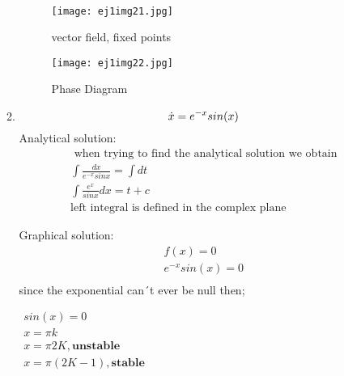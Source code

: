 \documentclass[a4paper,10pt]{article}
\begin{document}
\begin{enumerate}
\begin{enumerate}
\begin{equation}
\begin{aligned}
    		    \end{aligned}
		   \end{equation}
		   \begin{figure}[h]
                \centering
                \texttt{[image: ej1img21.jpg]}
                \caption{vector field, fixed points}
                \label{fig:mesh1}
        \end{figure}
        \begin{figure}[h]
                \centering
                \texttt{[image: ej1img22.jpg]}
                \caption{Phase Diagram}
                \label{fig:mesh1}
        \end{figure}
        \newpage
        \item
		    \begin{equation}
		        \dot{x}=e^{-x}sin(x)\\
		    \end{equation}
		    Analytical solution:
		    \begin{equation}
		        \begin{aligned}
    		       \text{ when trying to find the analytical solution we obtain}\\
    		        \int\frac{dx}{e^{-x}sinx}=\int dt\\
    		        \boxed{\int\frac{e^{x}}{sinx}dx=t+c}\\
    		        \text{left integral is defined in the complex plane}
		        \end{aligned}
		    \end{equation}
		   
		    Graphical solution:
		    \begin{equation}
		        \begin{aligned}
		            f(x)=0\\
		            e^{-x}sin(x)=0\\
		        \end{aligned}
		    \end{equation}
		    since the exponential can´t ever be null then; 
		   
		    \begin{math}
		        \begin{aligned}
		            sin(x)=0\\
                    x=\pi{k}\\
                	x=\pi{2K}, \textbf{unstable}\\
                	x=\pi{(2K-1)},\textbf{stable}
		       \end{aligned}
		    \end{math}
		            

\end{enumerate}
\end{enumerate}
\end{document}
